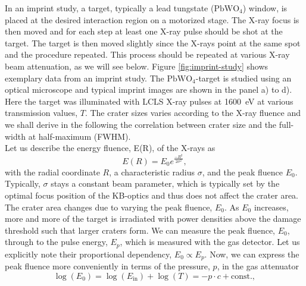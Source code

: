 %
In an imprint study, a target, typically a lead tungstate ($\text{PbWO}_{4}$) window, is placed at the desired interaction region on a motorized stage. The X-ray focus is then moved and for each step at least one X-ray pulse should be shot at the target. The target is then moved slightly since the X-rays point at the same spot and the procedure repeated. This process should be repeated at various X-ray beam attenuation, as we will see below. Figure \ref{fig:imprint-study} shows exemplary data from an imprint study. The $\text{PbWO}_{4}$-target is studied using an optical microscope and typical imprint images are shown in the panel a) to d). Here the target was illuminated with LCLS X-ray pulses at \SI{1600}{\electronvolt} at various transmission values, $T$. The crater sizes varies according to the X-ray fluence and we shall derive in the following the correlation between crater size and the full-width at half-maximum (FWHM).\\[1\baselineskip]
%
Let us describe the energy fluence, E(R), of the X-rays as
\begin{equation}
E(R) = E_{0} e^{\frac{-R^{2}}{2 \sigma^{2}}},
\end{equation}
with the radial coordinate $R$, a characteristic radius $\sigma$, and the peak fluence $E_{0}$. Typically, $\sigma$ stays a constant beam parameter, which is typically set by the optimal focus position of the KB-optics and thus does not affect the crater area. The crater area changes due to varying the peak fluence, $E_{0}$. As $E_{0}$ increases, more and more of the target is irradiated with power densities above the damage threshold such that larger craters form. We can measure the peak fluence, $E_{0}$, through to the pulse energy, $E_{p}$, which is measured with the gas detector. Let us explicitly note their proportional dependency, $E_{0}\propto E_{p}$. Now, we can express the peak fluence more conveniently in terms of the pressure, $p$, in the gas attenuator
\begin{equation}
\log(E_{0}) = \log(E_{\text{in}})+\log(T)= -p \cdot c + \text{const.},
\label{eq:gaussian-beam-imprint}
\end{equation}

